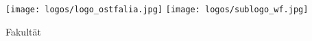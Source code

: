 


\frontmatter
\begin{titlepage}
\thispagestyle{titlepage}



    \hfill
    \texttt{[image: logos/logo\_ostfalia.jpg]}
    \texttt{[image: logos/sublogo\_wf.jpg]}

    \vspace{0.5em}
    \hspace{1cm}
    \begin{minipage}{\dimexpr\textwidth-1.5cm\relax}
        {\Large\textsf{Fakultät \faculty}}
    \end{minipage}

    \vfil


    \hspace{1cm}
    \begin{minipage}{\dimexpr\textwidth-1.5cm\relax}
        \hrulefill

        \vspace{2em}

        {\LARGE\textbf{\textsf{\documentSubject\documentYear}}}

        \vspace{2em}

        {\Huge\textbf{\textsf{\documentTitle}}}

        \vspace{2em}

        {\Large\textsf{\documentSubtitle}}

        \vspace{1em}

        \hrulefill
    \end{minipage}


    \vfil

    \begingroup
    \centering
    \endgroup


\end{titlepage}
